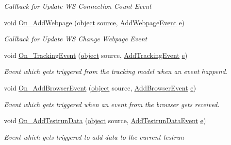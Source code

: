 \begin{DoxyCompactItemize}
\begin{DoxyCompactList}\small\item\em Callback for Update W\+S Connection Count Event \end{DoxyCompactList}\item 
void \hyperlink{class_web_analyzer_1_1_controller_1_1_test_controller_aac7dd97807dbc4bb9f7c8127b7f210e4}{On\+\_\+\+Add\+Webpage} (\hyperlink{_u_i_2_h_t_m_l_resources_2js_2lib_2underscore_8min_8js_aae18b7515bb2bc4137586506e7c0c903}{object} source, \hyperlink{class_web_analyzer_1_1_events_1_1_add_webpage_event}{Add\+Webpage\+Event} \hyperlink{_u_i_2_h_t_m_l_resources_2js_2lib_2bootstrap_8min_8js_ab5902775854a8b8440bcd25e0fe1c120}{e})
\begin{DoxyCompactList}\small\item\em Callback for Update W\+S Change Webpage Event \end{DoxyCompactList}\item 
void \hyperlink{class_web_analyzer_1_1_controller_1_1_test_controller_afd9f2518fa8375fbbb40b5267116316d}{On\+\_\+\+Tracking\+Event} (\hyperlink{_u_i_2_h_t_m_l_resources_2js_2lib_2underscore_8min_8js_aae18b7515bb2bc4137586506e7c0c903}{object} source, \hyperlink{class_web_analyzer_1_1_events_1_1_add_tracking_event}{Add\+Tracking\+Event} \hyperlink{_u_i_2_h_t_m_l_resources_2js_2lib_2bootstrap_8min_8js_ab5902775854a8b8440bcd25e0fe1c120}{e})
\begin{DoxyCompactList}\small\item\em Event which gets triggered from the tracking model when an event happend. \end{DoxyCompactList}\item 
void \hyperlink{class_web_analyzer_1_1_controller_1_1_test_controller_abc70d071b611a185c582588460ec25fe}{On\+\_\+\+Add\+Browser\+Event} (\hyperlink{_u_i_2_h_t_m_l_resources_2js_2lib_2underscore_8min_8js_aae18b7515bb2bc4137586506e7c0c903}{object} source, \hyperlink{class_web_analyzer_1_1_events_1_1_add_browser_event}{Add\+Browser\+Event} \hyperlink{_u_i_2_h_t_m_l_resources_2js_2lib_2bootstrap_8min_8js_ab5902775854a8b8440bcd25e0fe1c120}{e})
\begin{DoxyCompactList}\small\item\em Event which gets triggered when an event from the browser gets received. \end{DoxyCompactList}\item 
void \hyperlink{class_web_analyzer_1_1_controller_1_1_test_controller_a6108f3e3fdb88e99209d916b9d7d89d4}{On\+\_\+\+Add\+Testrun\+Data} (\hyperlink{_u_i_2_h_t_m_l_resources_2js_2lib_2underscore_8min_8js_aae18b7515bb2bc4137586506e7c0c903}{object} source, \hyperlink{class_web_analyzer_1_1_events_1_1_add_testrun_data_event}{Add\+Testrun\+Data\+Event} \hyperlink{_u_i_2_h_t_m_l_resources_2js_2lib_2bootstrap_8min_8js_ab5902775854a8b8440bcd25e0fe1c120}{e})
\begin{DoxyCompactList}\small\item\em Event which gets triggered to add data to the current testrun \end{DoxyCompactList}\end{DoxyCompactItemize}
